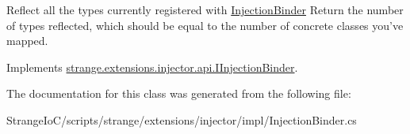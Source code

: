 Reflect all the types currently registered with \hyperlink{classstrange_1_1extensions_1_1injector_1_1impl_1_1_injection_binder}{Injection\-Binder} Return the number of types reflected, which should be equal to the number of concrete classes you've mapped. 



Implements \hyperlink{interfacestrange_1_1extensions_1_1injector_1_1api_1_1_i_injection_binder_a4f5f1efc3286ca4358d6ca9443c0f1d2}{strange.\-extensions.\-injector.\-api.\-I\-Injection\-Binder}.



The documentation for this class was generated from the following file\-:\begin{DoxyCompactItemize}
\item 
Strange\-Io\-C/scripts/strange/extensions/injector/impl/Injection\-Binder.\-cs\end{DoxyCompactItemize}
